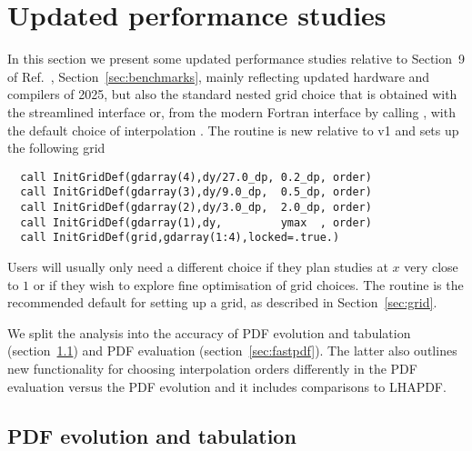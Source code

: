 \section{Updated performance studies}

In this section we present some updated performance studies relative
to
%
\ifreleasenote
Section~9 of Ref.~\cite{Salam:2008qg},
\else
Section~\ref{sec:benchmarks},
\fi
mainly reflecting updated hardware and compilers of 2025, but also the
standard nested grid choice that is obtained with the streamlined
interface or, from the modern Fortran interface by calling
, with the default
choice of interpolation .
%
\ifreleasenote
The  routine is new relative to v1 and sets up
the following grid
\begin{lstlisting}
  call InitGridDef(gdarray(4),dy/27.0_dp, 0.2_dp, order)
  call InitGridDef(gdarray(3),dy/9.0_dp,  0.5_dp, order)
  call InitGridDef(gdarray(2),dy/3.0_dp,  2.0_dp, order)
  call InitGridDef(gdarray(1),dy,         ymax  , order)
  call InitGridDef(grid,gdarray(1:4),locked=.true.)
\end{lstlisting}
Users will usually only need a different choice if they plan studies
at $x$ very close to $1$ or if they wish to explore fine optimisation of
grid choices.
\else
  The  routine is the recommended default
  for setting up a grid, as described in Section~\ref{sec:grid}.
\fi

We split the analysis into the accuracy of PDF evolution and
tabulation (section~\ref{sec:acc-pdf-evol}) and PDF evaluation
(section~\ref{sec:fastpdf}).
%
The latter also outlines new functionality for choosing interpolation
orders differently in the PDF evaluation versus the PDF evolution and
it includes comparisons to LHAPDF.


\subsection{PDF evolution and tabulation}
\label{sec:acc-pdf-evol}

